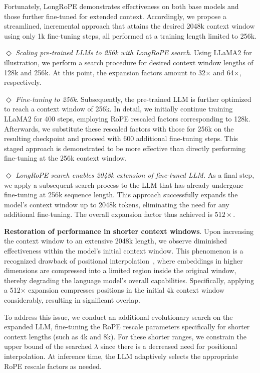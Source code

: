 Fortunately, LongRoPE demonstrates effectiveness on both base models and those further fine-tuned for extended context. Accordingly, we propose a streamlined, incremental approach that attains the desired 2048k context window using only 1k fine-tuning steps, all performed at a training length limited to 256k.

$\Diamond$ \textit{Scaling pre-trained LLMs to 256k with LongRoPE search}. Using LLaMA2 for illustration, we perform a search procedure for desired context window lengths of 128k and 256k. At this point, the expansion factors amount to 32$\times$ and 64$\times$, respectively.

$\Diamond$ \textit{Fine-tuning to 256k}. Subsequently, the pre-trained LLM is further optimized to reach a context window of 256k. In detail, we initially continue training LLaMA2 for 400 steps, employing RoPE rescaled factors corresponding to 128k. Afterwards, we substitute these rescaled factors with those for 256k on the resulting checkpoint and proceed with 600 additional fine-tuning steps. This staged approach is demonstrated to be more effective than directly performing fine-tuning at the 256k context window.

$\Diamond$ \textit{LongRoPE search enables 2048k extension of fine-tuned LLM}. As a final step, we apply a subsequent search process to the LLM that has already undergone fine-tuning at 256k sequence length. This approach successfully expands the model's context window up to 2048k tokens, eliminating the need for any additional fine-tuning. The overall expansion factor thus achieved is $512\times$.

\textbf{Restoration of performance in shorter context windows}. Upon increasing the context window to an extensive 2048k length, we observe diminished effectiveness within the model’s initial context window. This phenomenon is a recognized drawback of positional interpolation~\cite{pi}, where embeddings in higher dimensions are compressed into a limited region inside the original window, thereby degrading the language model’s overall capabilities. Specifically, applying a 512$\times$ expansion compresses positions in the initial 4k context window considerably, resulting in significant overlap.

To address this issue, we conduct an additional evolutionary search on the expanded LLM, fine-tuning the RoPE rescale parameters specifically for shorter context lengths (such as 4k and 8k). For these shorter ranges, we constrain the upper bound of the searched $\lambda$ since there is a decreased need for positional interpolation. At inference time, the LLM adaptively selects the appropriate RoPE rescale factors as needed.


